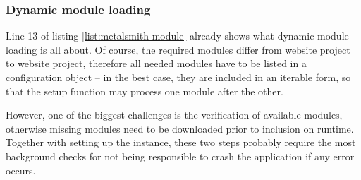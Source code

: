 \subsubsection{Dynamic module loading}
Line 13 of listing \ref{list:metalsmith-module} already shows what dynamic module loading is all about. Of course, the required modules differ from website project to website project, therefore all needed modules have to be listed in a configuration object -- in the best case, they are included in an iterable form, so that the setup function may process one module after the other.

However, one of the biggest challenges is the verification of available modules, otherwise missing modules need to be downloaded prior to inclusion on runtime. Together with setting up the instance, these two steps probably require the most background checks for not being responsible to crash the application if any error occurs.
